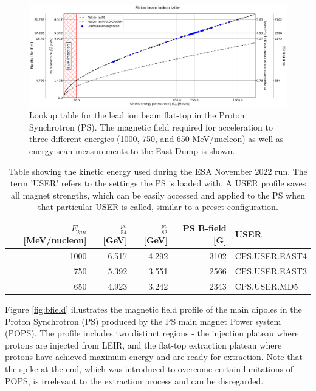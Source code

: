 \begin{figure}[!htb]
\centering
\includegraphics[width=1.0\textwidth]{images/PS_BEAM_ENERGY/kinetic_energy_lookup_chimera.png}
\caption{Lookup table for the lead ion beam flat-top in the Proton Synchrotron (PS). The magnetic field required for acceleration to three different energies (1000, 750, and 650 MeV/nucleon) as well as energy scan measurements to the East Dump is shown.}
\label{fig:lookup table}
\end{figure}

\begin{table}[h!]
\centering
\begin{tabular}{rrrrl}
\toprule
 $E_{kin}$ [MeV/nucleon] &  $\frac{pc}{54}$ [GeV] &  $\frac{pc}{82}$ [GeV] &  PS B-field [G] & USER\\
\midrule
  1000 &                        6.517 &                    4.292 &        3102 & CPS.USER.EAST4 \\
   750 &                        5.392 &                    3.551 &        2566 & CPS.USER.EAST3 \\
   650 &                        4.923 &                    3.242 &        2343 &   CPS.USER.MD5 \\
\bottomrule
\end{tabular}
\caption{Table showing the kinetic energy used during the ESA November 2022 run. The term 'USER' refers to the settings the PS is loaded with. A USER profile saves all magnet strengths, which can be easily accessed and applied to the PS when that particular USER is called, similar to a preset configuration.}
\label{table:KE_table}
\end{table}

Figure \ref{fig:bfield} illustrates the magnetic field profile of the main dipoles in the Proton Synchrotron (PS) produced by the PS main magnet Power system (POPS). The profile includes two distinct regions - the injection plateau where protons are injected from LEIR, and the flat-top extraction plateau where protons have achieved maximum energy and are ready for extraction. Note that the spike at the end, which was introduced to overcome certain limitations of POPS, is irrelevant to the extraction process and can be disregarded.

